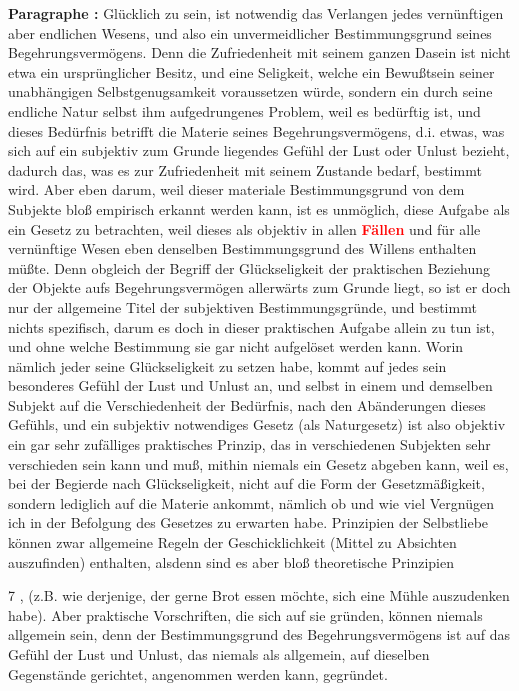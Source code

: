 \documentclass[a4paper,12pt,twoside]{book}
\newcommand{\match}[1]{\textcolor{red}{\textbf{#1}}}
\begin{document}
	\noindent\textbf{Paragraphe : }Glücklich zu sein, ist notwendig das Verlangen jedes vernünftigen aber endlichen Wesens, und also ein unvermeidlicher Bestimmungsgrund seines Begehrungsvermögens. Denn die Zufriedenheit mit seinem ganzen Dasein ist nicht etwa ein ursprünglicher Besitz, und eine Seligkeit, welche ein Bewußtsein seiner unabhängigen Selbstgenugsamkeit voraussetzen würde, sondern ein durch seine endliche Natur selbst ihm aufgedrungenes Problem, weil es bedürftig ist, und dieses Bedürfnis betrifft die Materie seines Begehrungsvermögens, d.i. etwas, was sich auf ein subjektiv zum Grunde liegendes Gefühl der Lust oder Unlust bezieht, dadurch das, was es zur Zufriedenheit mit seinem Zustande bedarf, bestimmt wird. Aber eben darum, weil dieser materiale Bestimmungsgrund von dem Subjekte bloß empirisch erkannt werden kann, ist es unmöglich, diese Aufgabe als ein Gesetz zu betrachten, weil dieses als objektiv in allen \match{Fällen} und für alle vernünftige Wesen eben denselben Bestimmungsgrund des Willens enthalten müßte. Denn obgleich der Begriff der Glückseligkeit der praktischen Beziehung der Objekte aufs Begehrungsvermögen allerwärts zum Grunde liegt, so ist er doch nur der allgemeine Titel der subjektiven Bestimmungsgründe, und bestimmt nichts spezifisch, darum es doch in dieser praktischen Aufgabe allein zu tun ist, und ohne welche Bestimmung sie gar nicht aufgelöset werden kann. Worin nämlich jeder seine Glückseligkeit zu setzen habe, kommt auf jedes sein besonderes Gefühl der Lust und Unlust an, und selbst in einem und demselben Subjekt auf die Verschiedenheit der Bedürfnis, nach den Abänderungen dieses Gefühls, und ein subjektiv notwendiges Gesetz (als Naturgesetz) ist also objektiv ein gar sehr zufälliges praktisches Prinzip, das in verschiedenen Subjekten sehr verschieden sein kann und  muß, mithin niemals ein Gesetz abgeben kann, weil es, bei der Begierde nach Glückseligkeit, nicht auf die Form der Gesetzmäßigkeit, sondern lediglich auf die Materie ankommt, nämlich ob und wie viel Vergnügen ich in der Befolgung des Gesetzes zu erwarten habe. Prinzipien der Selbstliebe können zwar allgemeine Regeln der Geschicklichkeit (Mittel zu Absichten auszufinden) enthalten, alsdenn sind es aber bloß theoretische Prinzipien
	
	
	7
	, (z.B. wie derjenige, der gerne Brot essen möchte, sich eine Mühle auszudenken habe). Aber praktische Vorschriften, die sich auf sie gründen, können niemals allgemein sein, denn der Bestimmungsgrund des Begehrungsvermögens ist auf das Gefühl der Lust und Unlust, das niemals als allgemein, auf dieselben Gegenstände gerichtet, angenommen werden kann, gegründet. 
	
\end{document}
